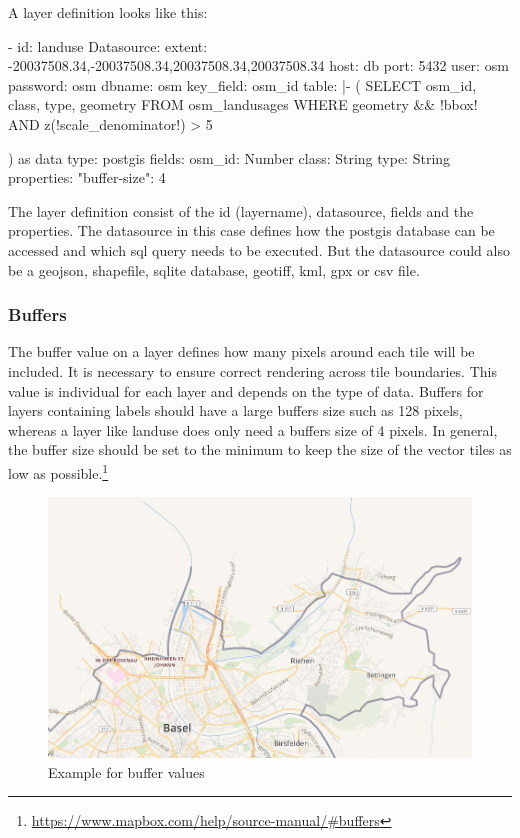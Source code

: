 A layer definition looks like this:
\begin{yamlcode}
- id: landuse
Datasource:
    extent: -20037508.34,-20037508.34,20037508.34,20037508.34
    host: db
    port: 5432
    user: osm
    password: osm
    dbname: osm
    key_field: osm_id
    table: |-
        (
            SELECT osm_id, class, type, geometry
            FROM osm_landusages
            WHERE geometry && !bbox!
            AND z(!scale_denominator!) > 5
        
        ) as data
    type: postgis
fields:
    osm_id: Number
    class: String
    type: String
properties:
    "buffer-size": 4
\end{yamlcode}
The layer definition consist of the id (layername), datasource, fields and the properties. The datasource in this case defines how the postgis database can be accessed and which sql query needs to be executed. But the datasource could also be a geojson, shapefile, sqlite database, geotiff, kml, gpx or csv file.


\subsubsection{Buffers}\label{buffers}
The buffer value on a layer defines how many pixels around each tile will be included. It is necessary to ensure correct rendering across tile boundaries. This value is individual for each layer and depends on the type of data. Buffers for layers containing labels should have a large buffers size such as 128 pixels, whereas a layer like landuse does only need a buffers size of 4 pixels. In general, the buffer size should be set to the minimum to keep the size of the vector tiles as low as possible.\footnote{\url{https://www.mapbox.com/help/source-manual/#buffers}}

\begin{figure}[h]
  \centering
  \includegraphics[width=1\textwidth]{images/buffer.png}
  \caption{Example for buffer values}
\end{figure}

